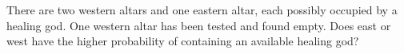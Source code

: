 There are two western altars and one eastern altar, each possibly occupied by a healing god. One western altar has been tested and found empty. Does east or west have the higher probability of containing an available healing god?
